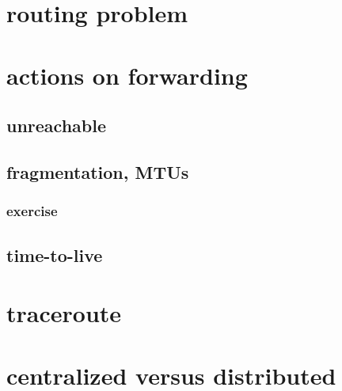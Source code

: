 \date{}
\title{}
\date{}

\begin{frame}
    \titlepage
\end{frame}

\section{routing problem}



\section{actions on forwarding}



\subsection{unreachable}

\subsection{fragmentation, MTUs}


\subsubsection{exercise}


\subsection{time-to-live}



\section{traceroute}


\section{centralized versus distributed}


